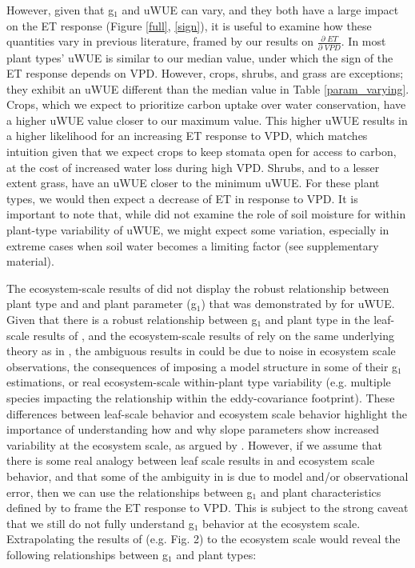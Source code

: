 \documentclass[draft]{agujournal2019}
\begin{document}
However, given that g$_1$ and uWUE can vary, and they both have a
large impact on the ET response (Figure \ref{full}, \ref{sign}), it is
useful to examine how these quantities vary in previous literature,
framed by our results on $\frac{\partial \; ET}{\partial \; VPD}$. In
 most plant types' uWUE is similar to our median
value, under which the sign of the ET response depends on
VPD. However, crops, shrubs, and grass are exceptions; they exhibit an
uWUE different than the median value in Table
\ref{param_varying}. Crops, which we expect to prioritize carbon
uptake over water conservation, have a higher uWUE value closer to our
maximum value. This higher uWUE results in a higher likelihood for an
increasing ET response to VPD, which matches intuition given that we
expect crops to keep stomata open for access to carbon, at the cost of
increased water loss during high VPD. Shrubs, and to a lesser extent
grass, have an uWUE closer to the minimum uWUE. For these plant types,
we would then expect a decrease of ET in response to VPD. It is
important to note that, while  did not examine the
role of soil moisture for within plant-type variability of uWUE, we
might expect some variation, especially in extreme cases when soil
water becomes a limiting factor (see supplementary material).

The ecosystem-scale results of  did not display the
robust relationship between plant type and and plant parameter (g$_1$)
that was demonstrated by  for uWUE. Given that there
is a robust relationship between g$_1$ and plant type in the
leaf-scale results of , and the ecosystem-scale
results of  rely on the same underlying theory as in
, the ambiguous results in 
could be due to noise in ecosystem scale observations, the
consequences of imposing a model structure in some of their g$_1$
estimations, or real ecosystem-scale within-plant type variability
(e.g. multiple species impacting the relationship within the
eddy-covariance footprint). These differences between leaf-scale
behavior and ecosystem scale behavior highlight the importance of
understanding how and why slope parameters show increased variability
at the ecosystem scale, as argued by . However, if
we assume that there is some real analogy between leaf scale results
in  and ecosystem scale behavior, and that some of the
ambiguity in  is due to model and/or observational
error, then we can use the relationships between g$_1$ and plant
characteristics defined by  to frame the ET response
to VPD. This is subject to the strong caveat that we still do not
fully understand g$_1$ behavior at the ecosystem scale. Extrapolating
the results of  (e.g. Fig. 2) to the ecosystem scale
would reveal the following relationships between g$_1$ and plant
types:
\end{document}
